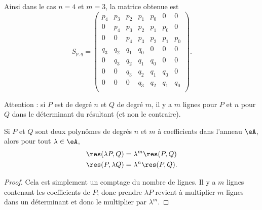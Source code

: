 Ainsi dans le cas \( n=4\) et \( m=3\), la matrice obtenue est
\begin{equation}    \label{EqPEgtle}
	S_{p,q}=\begin{pmatrix}
		p_4 & p_3 & p_2 & p_1 & p_0 & 0   & 0   \\
		0   & p_4 & p_3 & p_2 & p_1 & p_0 & 0   \\
		0   & 0   & p_4 & p_3 & p_2 & p_1 & p_0 \\
		q_3 & q_2 & q_1 & q_0 & 0   & 0   & 0   \\
		0   & q_3 & q_2 & q_1 & q_0 & 0   & 0   \\
		0   & 0   & q_3 & q_2 & q_1 & q_0 & 0   \\
		0   & 0   & 0   & q_3 & q_2 & q_1 & q_0 \\
	\end{pmatrix}.
\end{equation}

Attention : si \( P\) est de degré \( n\) et \( Q\) de degré \( m\), il y a \( m\) lignes pour \( P\) et \( n\) pour \( Q\) dans le déterminant du résultant (et non le contraire).

\begin{lemma}       \label{LemBFrhgnA}
	Si \( P\) et \( Q\) sont deux polynômes de degrés \( n\) et \( m\) à coefficients dans l'anneau \( \eA\), alors pour tout \( \lambda\in \eA\),
	\begin{subequations}
		\begin{align}
			\res(\lambda P,Q) & =\lambda^m\res(P,Q)  \\
			\res(P,\lambda Q) & =\lambda^n\res(P,Q).
		\end{align}
	\end{subequations}
\end{lemma}

\begin{proof}
	Cela est simplement un comptage du nombre de lignes. Il y a \( m\) lignes contenant les coefficients de \( P\); donc prendre \( \lambda P\) revient à multiplier \( m\) lignes dans un déterminant et donc le multiplier par \( \lambda^m\).
\end{proof}

